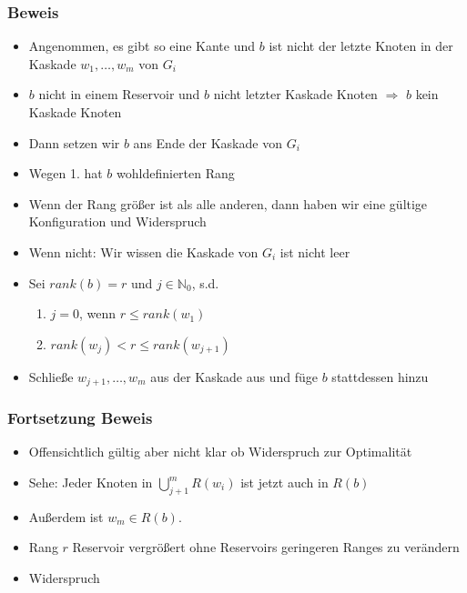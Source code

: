 \documentclass{beamer}
\newcommand{\nn}{\mathbb{N}}
\theoremstyle{definition}
\theoremstyle{plain}
\begin{document}
\begin{frame}
\frametitle{Beweis}
\begin{itemize}[<+->]
    \item Angenommen, es gibt so eine Kante und $b$ ist nicht der letzte Knoten in der Kaskade $w_1,\dotsc,w_m$ von $G_i$
    \item $b$ nicht in einem Reservoir und $b$ nicht letzter Kaskade Knoten $\Rightarrow$ $b$ kein Kaskade Knoten
    \item Dann setzen wir $b$ ans Ende der Kaskade von $G_i$ 
    \item Wegen 1. hat $b$ wohldefinierten Rang
    \item Wenn der Rang größer ist als alle anderen, dann haben wir eine gültige Konfiguration und Widerspruch
    \item Wenn nicht: Wir wissen die Kaskade von $G_i$ ist nicht leer
    \item Sei $rank(b)=r$ und $j\in\nn_0$, s.d.
    \begin{enumerate}[<+->]
        \item $j=0$, wenn $r\le rank(w_1)$ 
        \item $rank(w_j)<r\le rank(w_{j+1})$
    \end{enumerate}
    \item Schließe $w_{j+1},\dotsc,w_m$ aus der Kaskade aus und füge $b$ stattdessen hinzu
\end{itemize}
\end{frame}
\begin{frame}
\frametitle{Fortsetzung Beweis}
   \begin{itemize}[<+->]
    \item Offensichtlich gültig aber nicht klar ob Widerspruch zur Optimalität
    \item Sehe: Jeder Knoten in $\bigcup_{j+1}^m R(w_i)$ ist jetzt auch in $R(b)$
    \item Außerdem ist $w_m\in R(b)$.
    \item Rang $r$ Reservoir vergrößert ohne Reservoirs geringeren Ranges zu verändern
    \item Widerspruch
 \end{itemize}
\end{frame}
\end{document}
